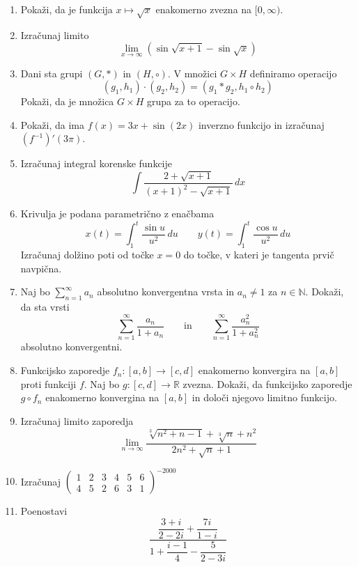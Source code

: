 \documentclass[a4paper,12pt]{article}
\begin{document}
\begin{enumerate}
\item
Pokaži, da je funkcija $x \mapsto \sqrt{x}$ enakomerno zvezna na $[0,\infty)$.

\item
Izračunaj limito
$$ \lim_{x \to \infty} (\sin\sqrt{x+1}-\sin\sqrt{x}) $$

\item
Dani sta grupi $(G,\ast)$ in $(H,\circ)$. V množici $G \times H$ definiramo operacijo
$$ (g_1, h_1) \cdot (g_2, h_2) = (g_1 \ast g_2, h_1 \circ h_2) $$
Pokaži, da je množica $G \times H$ grupa za to operacijo.

\item
Pokaži, da ima $f(x) = 3x + \sin(2x)$ inverzno funkcijo in izračunaj $(f^{-1})'(3\pi)$.

\item
Izračunaj integral korenske funkcije
$$ \int \frac{2+\sqrt{x+1}}{(x+1)^2-\sqrt{x+1}} \, dx $$

\item
Krivulja je podana parametrično z enačbama
$$
   x(t) = \int_1^t \frac{\sin u}{u^2}\,du \qquad
   y(t) = \int_1^t \frac{\cos u}{u^2}\,du
$$
Izračunaj dolžino poti od točke $x=0$ do točke, v kateri je tangenta prvič navpična.

\item
Naj bo $\sum_{n=1}^\infty a_n$ absolutno konvergentna vrsta in $a_n \ne 1$ za $n \in \mathbb{N}$.
Dokaži, da sta vrsti
$$
   \sum_{n=1}^\infty \frac{a_n}{1+a_n} \qquad \text{in} \qquad
   \sum_{n=1}^\infty \frac{a_n^2}{1+a_n^2}
$$
absolutno konvergentni.

\item
Funkcijsko zaporedje $f_n: [a,b] \to [c,d]$ enakomerno konvergira na $[a,b]$ proti funkciji $f$.
Naj bo $g: [c,d] \to \mathbb{R}$ zvezna. Dokaži, da funkcijsko zaporedje $g \circ f_n$
enakomerno konvergina na $[a,b]$ in določi njegovo limitno funkcijo.

\item
Izračunaj limito zaporedja
$$ \lim_{n\to\infty} \frac{\sqrt[3]{n^2+n-1}+\sqrt[3]{n}+n^2}{2n^2+\sqrt{n}+1} $$

\item
Izračunaj
$ \displaystyle{\left(\begin{array}{cccccc}1&2&3&4&5&6\\4&5&2&6&3&1\end{array}\right)^{-2000}} $

\item
Poenostavi
$$ \frac{\dfrac{3+i}{2-2i} + \dfrac{7i}{1-i}}{1 + \dfrac{i-1}{4} - \dfrac{5}{2-3i}} $$


\end{enumerate}
\end{document}
